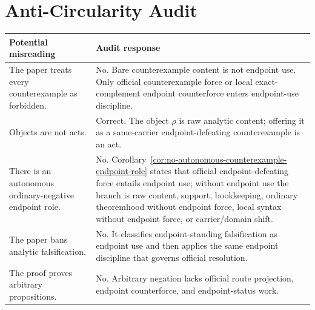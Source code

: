 \documentclass[11pt]{article}
\begin{document}
\section{Anti-Circularity Audit}\label{app:anticirc}

\begin{longtable}{L{0.32\textwidth}L{0.58\textwidth}}
\toprule
Potential misreading & Audit response\\
\midrule
The paper treats every counterexample as forbidden. & No.  Bare counterexample content is not endpoint use.  Only official counterexample force or local exact-complement endpoint counterforce enters endpoint-use discipline.\\
Objects are not acts. & Correct.  The object \(\rho\) is raw analytic content; offering it as a same-carrier endpoint-defeating counterexample is an act.\\
There is an autonomous ordinary-negative endpoint role. & No.  Corollary~\ref{cor:no-autonomous-counterexample-endpoint-role} states that official endpoint-defeating force entails endpoint use; without endpoint use the branch is raw content, support, bookkeeping, ordinary theoremhood without endpoint force, local syntax without endpoint force, or carrier/domain shift.\\
The paper bans analytic falsification. & No.  It classifies endpoint-standing falsification as endpoint use and then applies the same endpoint discipline that governs official resolution.\\
The proof proves arbitrary propositions. & No.  Arbitrary negation lacks official route projection, endpoint counterforce, and endpoint-status work.\\
\bottomrule
\end{longtable}
\end{document}
